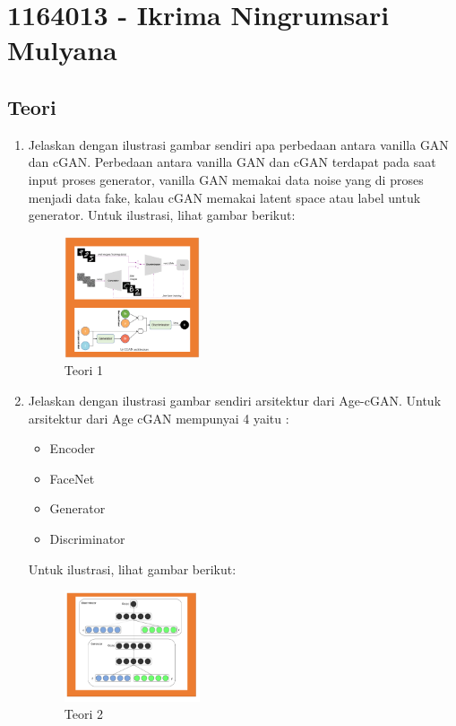 \section{1164013 - Ikrima Ningrumsari Mulyana}
\subsection{Teori}
\begin{enumerate}
    \item Jelaskan dengan ilustrasi gambar sendiri apa perbedaan antara vanilla GAN dan cGAN.
	\hfill\break
	Perbedaan antara vanilla GAN dan cGAN terdapat pada saat input proses generator, vanilla GAN memakai data noise yang di proses menjadi data fake, kalau cGAN memakai latent space atau label untuk generator. Untuk ilustrasi, lihat gambar berikut: 
    \begin{figure}[H]
		\includegraphics[width=4cm]{figures/1164013/9/teori1.png}
		\centering
		\caption{Teori 1}
	\end{figure}
	
	\item Jelaskan dengan ilustrasi gambar sendiri arsitektur dari Age-cGAN.
	\hfill\break
	Untuk arsitektur dari Age cGAN mempunyai 4 yaitu :
	\begin{itemize}
		\item Encoder
		\item FaceNet
		\item Generator
		\item Discriminator
	\end{itemize}
	Untuk ilustrasi, lihat gambar berikut: 
	\begin{figure}[H]
		\includegraphics[width=4cm]{figures/1164013/9/teori2.png}
		\centering
		\caption{Teori 2}
	\end{figure}


\end{enumerate}
